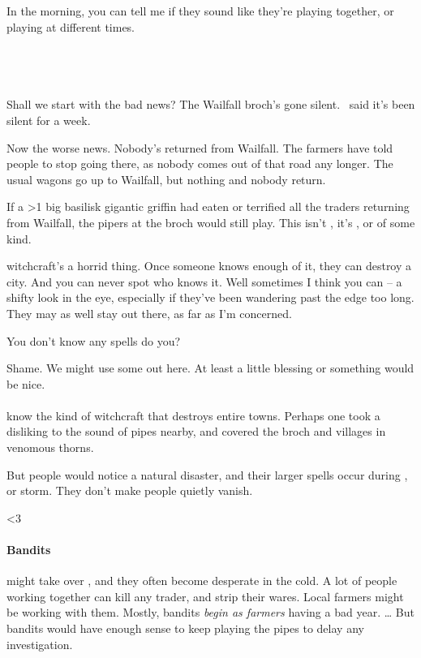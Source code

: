 In the morning, you can tell me if they sound like they're playing together, or playing at different times.

\subsection*{~}

Shall we start with the bad news?
The Wailfall \gls{broch}'s gone silent.
\currentName\ said it's been silent for a week.

Now the worse news.
Nobody's returned from Wailfall.
The farmers have told people to stop going there, as nobody comes out of that road any longer.
The usual wagons go up to Wailfall, but nothing and nobody return.

If a
\ifnum\thetemperature>1%
  big \gls{basilisk}
\else%
  gigantic \gls{griffin}
\fi%
had eaten or terrified all the traders returning from Wailfall, the pipers at the \gls{broch} would still play.
This isn't , it's , or  of some kind.

\Gls{witchcraft}'s a horrid thing.
Once someone knows enough of it, they can destroy a city.
And you can never spot who knows it.
Well sometimes I think you can -- a shifty look in the eye, especially if they've been wandering past the \gls{edge} too long.
They may as well stay out there, as far as I'm concerned.

You don't know any \glspl{spell} do you?

Shame.
We might use some out here.
At least a little blessing or something would be nice.

\paragraph{}
know the kind of \gls{witchcraft} that destroys entire towns.
Perhaps one took a disliking to the sound of pipes nearby, and covered the \gls{broch} and \glspl{village} in venomous thorns.

But people would notice a natural disaster, and their larger \glspl{spell} occur during , or \gls{storm}.
They don't make people quietly vanish.

\ifnum\thecycle<3
  \paragraph{Bandits}
  might take over , and they often become desperate in the cold.
  A lot of people working together can kill any trader, and strip their wares.
  Local farmers might be working with them.
  Mostly, bandits \emph{begin as farmers} having a bad year.
  \ldots
  But bandits would have enough sense to keep playing the pipes to delay any investigation.
\else%
